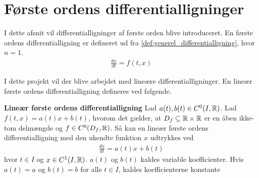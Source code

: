 \section{Første ordens differentialligninger}

I dette afsnit vil differentialligninger af første orden blive introduceret. 
En første ordens differentialligning er defineret ud fra \autoref{def:generel_differentialligning}, hvor $n=1$. 
\begin{align}
    \frac{dx}{dt}=f(t,x)  
\end{align}

I dette projekt vil der blive arbejdet med lineære differentialligninger. En lineær første ordens differentialligning defineres ved følgende. \\
\begin{minipage}\textwidth
\begin{defn} \textbf{Lineær første ordens differentialligning} %
\newline
Lad $a(t), b(t)\in C^0(I,\mathbb{R})$. Lad $f(t,x)=a(t)x+b(t)$, hvorom det gælder, at $D_f \subseteq \mathbb{R} \times \mathbb{R}$ er en åben ikke-tom delmængde og $f \in C^0(D_f,\mathbb{R})$. Så kan en lineær første ordens differentialligning med den ukendte funktion $x$ udtrykkes ved
\begin{align}
    \frac{dx}{dt}=a(t)x+b(t)
\end{align}
hvor $t \in I$ og $x \in C^1(I,\mathbb{R})$. 
$a(t)$ og $b(t)$ kaldes variable koefficienter. Hvis $a(t)=a$ og $b(t)=b$ for alle $t\in I$, kaldes koefficienterne konstante


\end{defn}
\end{minipage}





